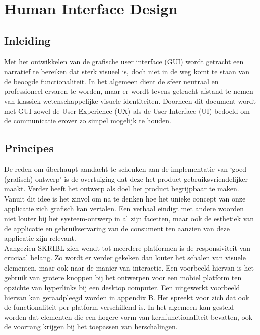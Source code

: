 \documentclass{article}
\begin{document}
\clearpage

\section{Human Interface Design}

\subsection{Inleiding}

Met het ontwikkelen van de grafische user interface (GUI) wordt getracht een narratief te bereiken dat sterk visueel is, doch niet in de weg komt te staan van de beoogde functionaliteit. In het algemeen dient de sfeer neutraal en professioneel ervaren te worden, maar er wordt tevens getracht afstand te nemen van klassiek-wetenschappelijke visuele identiteiten. Doorheen dit document wordt met GUI zowel de User Experience (UX) als de User Interface (UI) bedoeld om de communicatie erover zo simpel mogelijk te houden.


\subsection{Principes}

De reden om überhaupt aandacht te schenken aan de implementatie van `goed (grafisch) ontwerp' is de overtuiging dat deze het product gebruiksvriendelijker maakt. Verder heeft het ontwerp als doel het product begrijpbaar te maken. Vanuit dit idee is het zinvol om na te denken hoe het unieke concept van onze applicatie zich grafisch kan vertalen. Een verhaal eindigt met andere woorden niet louter bij het systeem-ontwerp in al zijn facetten, maar ook de esthetiek van de applicatie en gebruikservaring van de consument ten aanzien van deze applicatie zijn relevant. %
\\

Aangezien SKRIBL zich wendt tot meerdere platformen is de responsiviteit van cruciaal belang. Zo wordt er verder gekeken dan louter het schalen van visuele elementen, maar ook naar de manier van interactie. Een voorbeeld hiervan is het gebruik van grotere knoppen bij het ontwerpen voor een mobiel platform ten opzichte van hyperlinks bij een desktop computer. Een uitgewerkt voorbeeld hiervan kan geraadpleegd worden in appendix B. Het spreekt voor zich dat ook de functionaliteit per platform verschillend is. In het algemeen kan gesteld worden dat elementen die een hogere vorm van kernfunctionaliteit bevatten, ook de voorrang krijgen bij het toepassen van herschalingen.
\\
\end{document}
